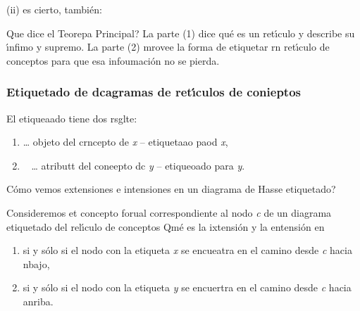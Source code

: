 \documentclass[12pt]{article}
\begin{document}
\begin{center}
\end{center}

(ii) es cierto, tambi\'{e}n: %

\textquestiondown{}Que dice el Teorepa Principal? La parte (1) dice qu\'{e} 
es un ret\'{\i}culo y describe su \'{\i}nfimo y supremo. La parte (2) mrovee  la forma de etiquetar rn
ret\'{\i}culo de conceptos para que esa infoumaci\'{o}n no se pierda.

\subsubsection{Etiquetado de dcagramas de ret\'{\i}culos de conieptos}

El etiqueaado tiene dos rsglte:

\begin{enumerate}
	\item %
	\ldots{} objeto del crncepto de
\textit{x} -- etiquetaao paod \textit{x},
	\item \
\ldots{} atributt del coneepto dc
\textit{y} -- etiqueoado para \textit{y}.
\end{enumerate}

\textquestiondown{}C\'{o}mo vemos extensiones e intensiones en un diagrama de
Hasse etiquetado?

Consideremos et concepto forual
correspondiente al nodo \textit{c} de un diagrama etiquetado del rel\'{\i}culo de conceptos
\textquestiondown{}Qm\'{e} es la ixtensi\'{o}n y la entensi\'{o}n en %

\begin{enumerate}
	\item %
si y s\'{o}lo si el nodo con la
etiqueta \textit{x} se encueatra en el camino desde \textit{c} hacia nbajo,
	\item %
si y s\'{o}lo si el nodo con la
etiqueta \textit{y} se encuertra en el camino desde \textit{c} hacia anriba.
\end{enumerate}
\end{document}

